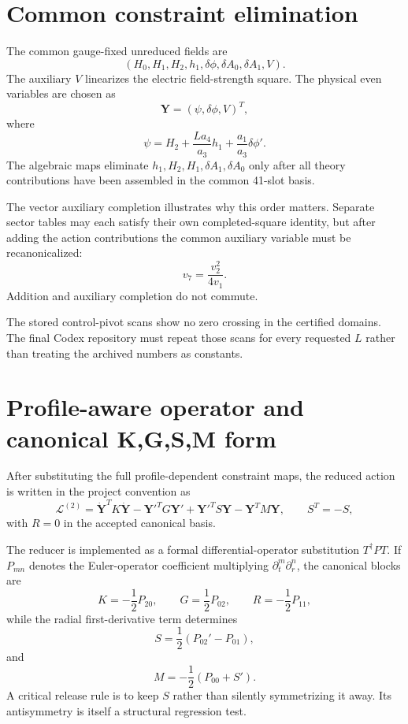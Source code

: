 \documentclass[11pt,a4paper,oneside]{book}
\newcommand{\Lag}{\mathcal{L}}
\begin{document}
\chapter{Common constraint elimination}
The common gauge-fixed unreduced fields are
\begin{equation}
 (H_0,H_1,H_2,h_1,\delta\phi,\delta A_0,\delta A_1,V).
\end{equation}
The auxiliary $V$ linearizes the electric field-strength square. The physical even variables are chosen as
\begin{equation}
 \bm Y=(\psi,\delta\phi,V)^T,
\end{equation}
where
\begin{equation}
 \boxed{\psi=H_2+\frac{La_4}{a_3}h_1+\frac{a_1}{a_3}\delta\phi'.}
\end{equation}
The algebraic maps eliminate $h_1,H_2,H_1,\delta A_1,\delta A_0$ only after all theory contributions have been assembled in the common 41-slot basis.

The vector auxiliary completion illustrates why this order matters. Separate sector tables may each satisfy their own completed-square identity, but after adding the action contributions the common auxiliary variable must be recanonicalized:
\begin{equation}
 \boxed{v_7=\frac{v_2^2}{4v_1}.}
\end{equation}
Addition and auxiliary completion do not commute.

The stored control-pivot scans show no zero crossing in the certified domains. The final Codex repository must repeat those scans for every requested $L$ rather than treating the archived numbers as constants.

\chapter{Profile-aware operator and canonical K,G,S,M form}
After substituting the full profile-dependent constraint maps, the reduced action is written in the project convention as
\begin{equation}
 \Lag^{(2)}=\dot{\bm Y}^T K\dot{\bm Y}
 -\bm Y'^T G\bm Y'
 +\bm Y'^T S\bm Y
 -\bm Y^T M\bm Y,
 \qquad S^T=-S,
 \label{eq:KRGM}
\end{equation}
with $R=0$ in the accepted canonical basis.

The reducer is implemented as a formal differential-operator substitution $T^\dagger P T$. If $P_{mn}$ denotes the Euler-operator coefficient multiplying $\partial_t^m\partial_r^n$, the canonical blocks are
\begin{equation}
 K=-\frac12P_{20},\qquad G=\frac12P_{02},\qquad R=-\frac12P_{11},
\end{equation}
while the radial first-derivative term determines
\begin{equation}
 S=\frac12(P_{02}'-P_{01}),
\end{equation}
and
\begin{equation}
 M=-\frac12(P_{00}+S').
\end{equation}
A critical release rule is to keep $S$ rather than silently symmetrizing it away. Its antisymmetry is itself a structural regression test.
\end{document}
